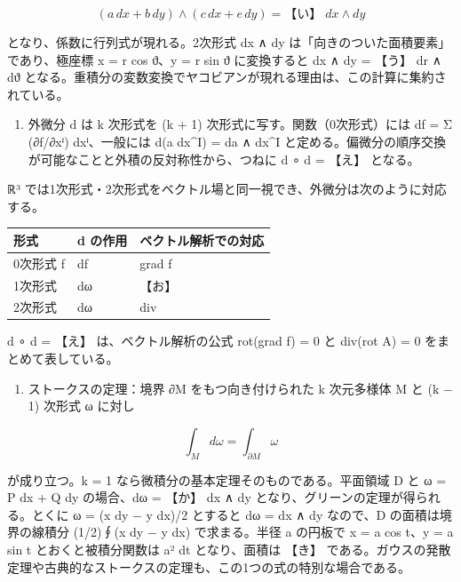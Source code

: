 \documentclass[
  10pt,
  a4paper,
]{article}
\providecommand{\tightlist}{%
  \setlength{\itemsep}{0pt}\setlength{\parskip}{0pt}}
\begin{document}
\[(a\,dx + b\,dy) \wedge (c\,dx + e\,dy) = \text{【い】}\; dx \wedge dy\]

となり、係数に行列式が現れる。2次形式 dx ∧ dy
は「向きのついた面積要素」であり、極座標 x = r cos {\fallbackfont ϑ}、y
= r sin {\fallbackfont ϑ} に変換すると dx ∧ dy = 【う】 dr ∧
d{\fallbackfont ϑ}
となる。重積分の変数変換でヤコビアンが現れる理由は、この計算に集約されている。

\begin{enumerate}
\def\labelenumi{(\arabic{enumi})}
\setcounter{enumi}{1}
\tightlist
\item
  外微分 d は k 次形式を (k + 1) 次形式に写す。関数（0次形式）には df =
  Σ (∂f/∂x{\fallbackfont ⁱ}) dx{\fallbackfont ⁱ}、一般には d(a dx\^{}I)
  = da ∧ dx\^{}I
  と定める。偏微分の順序交換が可能なことと外積の反対称性から、つねに d
  {\fallbackfont ∘} d = 【え】 となる。
\end{enumerate}

{\fallbackfont ℝ}³
では1次形式・2次形式をベクトル場と同一視でき、外微分は次のように対応する。

\begin{longtable}[]{@{}lll@{}}
\toprule\noalign{}
形式 & d の作用 & ベクトル解析での対応 \\
\midrule\noalign{}
\endhead
\bottomrule\noalign{}
\endlastfoot
0次形式 f & df & grad f \\
1次形式 & dω & 【お】 \\
2次形式 & dω & div \\
\end{longtable}

d {\fallbackfont ∘} d = 【え】 は、ベクトル解析の公式 rot(grad f) = 0 と
div(rot A) = 0 をまとめて表している。

\begin{enumerate}
\def\labelenumi{(\arabic{enumi})}
\setcounter{enumi}{2}
\tightlist
\item
  ストークスの定理：境界 ∂M をもつ向き付けられた k 次元多様体 M と (k −
  1) 次形式 ω に対し
\end{enumerate}

\[\int_M d\omega = \int_{\partial M} \omega\]

が成り立つ。k = 1 なら微積分の基本定理そのものである。平面領域 D と ω =
P dx + Q dy の場合、dω = 【か】 dx ∧ dy
となり、グリーンの定理が得られる。とくに ω = (x dy − y dx)/2 とすると dω
= dx ∧ dy なので、D の面積は境界の線積分 (1/2)∮(x dy − y dx)
で求まる。半径 a の円板で x = a cos t、y = a sin t とおくと被積分関数は
a² dt となり、面積は 【き】
である。ガウスの発散定理や古典的なストークスの定理も、この1つの式の特別な場合である。
\end{document}
